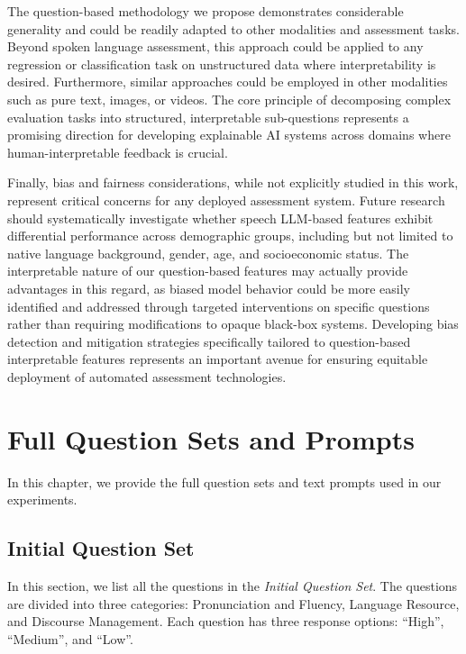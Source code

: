 \documentclass{report}
\begin{document}
The question-based methodology we propose demonstrates considerable generality and could be readily adapted to other modalities and assessment tasks. Beyond spoken language assessment, this approach could be applied to any regression or classification task on unstructured data where interpretability is desired. Furthermore, similar approaches could be employed in other modalities such as pure text, images, or videos. The core principle of decomposing complex evaluation tasks into structured, interpretable sub-questions represents a promising direction for developing explainable AI systems across domains where human-interpretable feedback is crucial.

Finally, bias and fairness considerations, while not explicitly studied in this work, represent critical concerns for any deployed assessment system. Future research should systematically investigate whether speech LLM-based features exhibit differential performance across demographic groups, including but not limited to native language background, gender, age, and socioeconomic status. The interpretable nature of our question-based features may actually provide advantages in this regard, as biased model behavior could be more easily identified and addressed through targeted interventions on specific questions rather than requiring modifications to opaque black-box systems. Developing bias detection and mitigation strategies specifically tailored to question-based interpretable features represents an important avenue for ensuring equitable deployment of automated assessment technologies.

\appendix




\chapter{Full Question Sets and Prompts}
\label{app:full_question_sets}
In this chapter, we provide the full question sets and text prompts used in our experiments.

\section{Initial Question Set}
\label{app_sec:initial_question_set}
In this section, we list all the questions in the \emph{Initial Question Set}. The questions are divided into three categories: Pronunciation and Fluency, Language Resource, and Discourse Management. Each question has three response options: ``High'', ``Medium'', and ``Low''.
\end{document}
